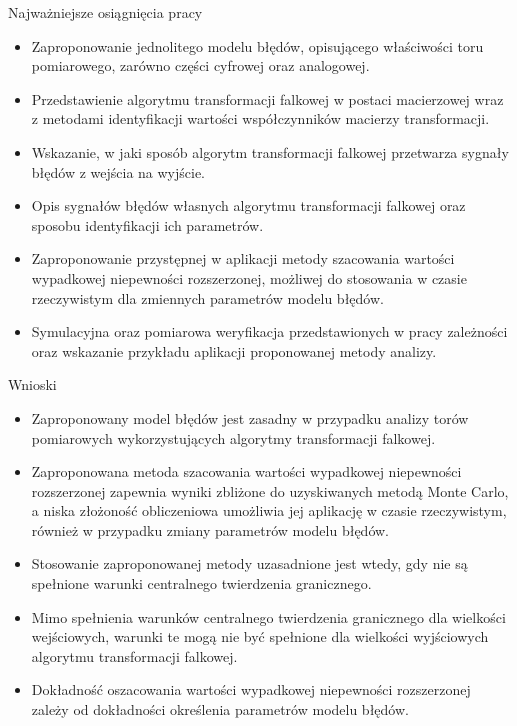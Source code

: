 \documentclass[12pt, polish, aspectratio = 169]{slides}
\begin{document}
\begin{frame}{Najważniejsze osiągnięcia pracy}
\begin{itemize}
\item Zaproponowanie jednolitego modelu błędów, opisującego właściwości toru pomiarowego, zarówno części cyfrowej oraz analogowej.
\item Przedstawienie algorytmu transformacji falkowej w postaci macierzowej wraz z metodami identyfikacji wartości współczynników macierzy transformacji.
\item Wskazanie, w jaki sposób algorytm transformacji falkowej przetwarza sygnały błędów z wejścia na wyjście.
\item Opis sygnałów błędów własnych algorytmu transformacji falkowej oraz sposobu identyfikacji ich parametrów.
\item Zaproponowanie przystępnej w aplikacji metody szacowania wartości wypadkowej niepewności rozszerzonej, możliwej do stosowania w czasie rzeczywistym dla zmiennych parametrów modelu błędów.
\item Symulacyjna oraz pomiarowa weryfikacja przedstawionych w pracy zależności oraz wskazanie przykładu aplikacji proponowanej metody analizy.
\end{itemize}
\end{frame}

\begin{frame}{Wnioski}
\begin{itemize}
\item Zaproponowany model błędów jest zasadny w przypadku analizy torów pomiarowych wykorzystujących algorytmy transformacji falkowej.
\item Zaproponowana metoda szacowania wartości wypadkowej niepewności rozszerzonej zapewnia wyniki zbliżone do uzyskiwanych metodą Monte Carlo, a niska złożoność obliczeniowa umożliwia jej aplikację w czasie rzeczywistym, również w przypadku zmiany parametrów modelu błędów.
\item Stosowanie zaproponowanej metody uzasadnione jest wtedy, gdy nie są spełnione warunki centralnego twierdzenia granicznego.
\item Mimo spełnienia warunków centralnego twierdzenia granicznego dla wielkości wejściowych, warunki te mogą nie być spełnione dla wielkości wyjściowych algorytmu transformacji falkowej.
\item Dokładność oszacowania wartości wypadkowej niepewności rozszerzonej zależy od dokładności określenia parametrów modelu błędów.
\end{itemize}
\end{frame}
\end{document}
